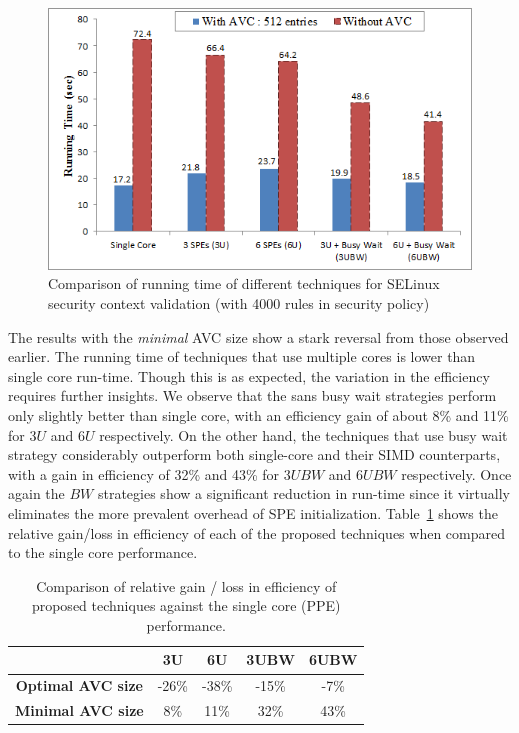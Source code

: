 \documentclass[conference]{IEEEtran}
\begin{document}
\begin{figure}
\centerline{\includegraphics[scale=0.58]{images/techs.png}}
\caption{Comparison of running time of different techniques for SELinux security context validation (with 4000 rules in security policy)}
\label{figGraphTech}
\vspace{-0.05cm}
\end{figure}

The results with the \emph{minimal} AVC size show a stark reversal from those
observed earlier.  The running time of techniques that use multiple
cores is lower than single core run-time.  Though this is as expected,
the variation in the efficiency requires further insights.  We observe
that the sans busy wait strategies perform only slightly better than
single core, with an efficiency gain of about 8\% and 11\% for $3U$
and $6U$ respectively.  On the other hand, the techniques that use
busy wait strategy considerably outperform both single-core and their
SIMD counterparts, with a gain in efficiency of 32\% and 43\% for
$3UBW$ and $6UBW$ respectively.  Once again the $BW$ strategies show a
significant reduction in run-time since it virtually eliminates the
more prevalent overhead of SPE initialization.  Table~\ref{tab1} shows
the relative gain/loss in efficiency of each of the proposed
techniques when compared to the single core performance.

\begin{table}[ht]
\centering
\caption{Comparison of relative gain / loss in efficiency of proposed techniques against the single core (PPE) performance.}
\begin{tabular}{|c|c|c|c|c|} \hline
 &\textbf{3U}&\textbf{6U}&\textbf{3UBW}&\textbf{6UBW}\\ \hline
\textbf{Optimal AVC size}& -26\%& -38\%& -15\% & -7\%\\ \hline
\textbf{Minimal AVC size}& 8\%& 11\%& 32\% & 43\%\\ \hline
\end{tabular}
\label{tab1}
\end{table}
\end{document}
